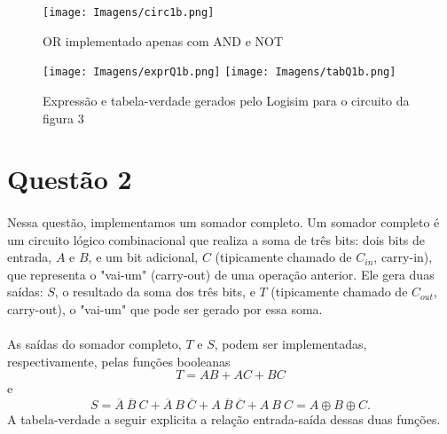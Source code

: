 \documentclass[a4paper, 12pt]{article}
\begin{document}
\begin{figure}[H]
    \centering
    \texttt{[image: Imagens/circ1b.png]}
    \caption{OR implementado apenas com AND e NOT}
\end{figure}

\begin{figure}[H]
    \centering
    \texttt{[image: Imagens/exprQ1b.png]}
    \texttt{[image: Imagens/tabQ1b.png]} \\
    \caption{Expressão e tabela-verdade gerados pelo Logisim para o circuito da figura 3}
\end{figure}

\section{Questão 2}
\paragraph{}
Nessa questão, implementamos um somador completo. Um somador completo é um circuito lógico combinacional que realiza a soma de três bits: dois bits de entrada, $A$ e $B$, e um bit adicional, $C$ (tipicamente chamado de $C_{in}$, carry-in), que representa o "vai-um" (carry-out) de uma operação anterior. Ele gera duas saídas: $S$, o resultado da soma dos três bits, e $T$ (tipicamente chamado de $C_{out}$, carry-out), o "vai-um" que pode ser gerado por essa soma.
\paragraph{}
As saídas do somador completo, $T$ e $S$, podem ser implementadas, respectivamente, pelas funções booleanas
\[T = AB + AC + BC\] e \[S = \overline{A} \ \overline{B} \ C + \overline{A} \ B \ \overline{C} + A \ \overline{B} \ \overline{C} + A \ B \ C = A \oplus B \oplus C.\] A tabela-verdade a seguir explicita a relação entrada-saída dessas duas funções.
\end{document}
